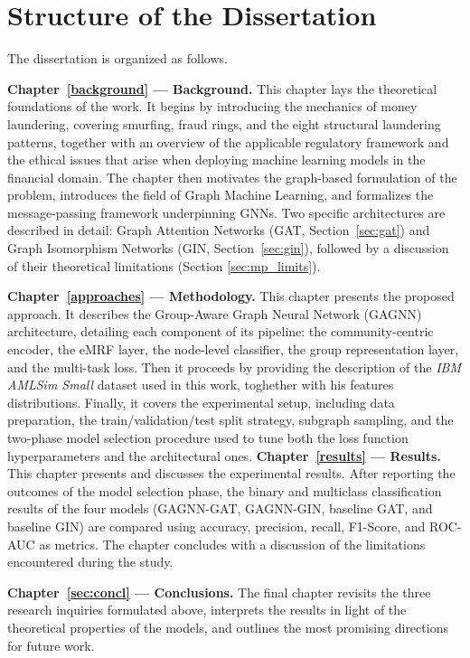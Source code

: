 \section{Structure of the Dissertation}
The dissertation is organized as follows.

\textbf{Chapter~\ref{background} --- Background.}
This chapter lays the theoretical foundations of the work. It begins by introducing the mechanics of money laundering, covering smurfing, fraud rings, and the eight structural laundering patterns, together with an overview of the applicable regulatory framework and the ethical issues that arise when deploying machine learning models in the financial domain. The chapter then motivates the graph-based formulation of the problem, introduces the field of Graph Machine Learning, and formalizes the message-passing framework underpinning GNNs. Two specific architectures are described in detail: Graph Attention Networks (GAT, Section~\ref{sec:gat}) and Graph Isomorphism Networks (GIN, Section~\ref{sec:gin}), followed by a discussion of their theoretical limitations (Section \ref{sec:mp_limits}).

\textbf{Chapter~\ref{approaches} --- Methodology.}
This chapter presents the proposed approach. It describes the Group-Aware Graph Neural Network (GAGNN) architecture, detailing each component of its pipeline: the community-centric encoder, the eMRF layer, the node-level classifier, the group representation layer, and the multi-task loss.
Then it proceeds by providing the description of the \textit{IBM AMLSim Small} dataset used in this work, toghether with his features distributions.
Finally, it covers the experimental setup, including data preparation, the train/validation/test split strategy, subgraph sampling, and the two-phase model selection procedure used to tune both the loss function hyperparameters and the architectural ones.
\textbf{Chapter~\ref{results} --- Results.}
This chapter presents and discusses the experimental results. After reporting the outcomes of the model selection phase, the binary and multiclass classification results of the four models (GAGNN-GAT, GAGNN-GIN, baseline GAT, and baseline GIN) are compared using accuracy, precision, recall, F1-Score, and ROC-AUC as metrics. The chapter concludes with a discussion of the limitations encountered during the study.

\textbf{Chapter~\ref{sec:concl} --- Conclusions.}
The final chapter revisits the three research inquiries formulated above, interprets the results in light of the theoretical properties of the models, and outlines the most promising directions for future work.
